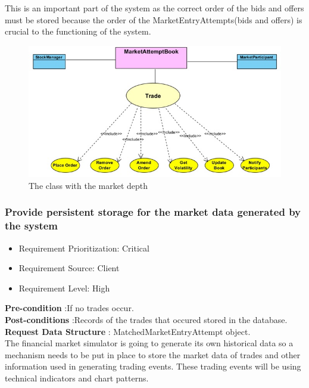\documentclass[12pt]{article}
\begin{document}
						This is an important part of the system as the correct order of the bids and offers must be stored because the order of the MarketEntryAttempts(bids and offers) is crucial to the functioning of the system.
						
						\begin{figure}[th]
									\centering
									\includegraphics[scale=0.6]{./USE_CASE_Market_Attempt_Book_Financial_Market_Simulator}
									\caption{The class with the market depth}
									\label{domain objects}
						\end{figure}
												
				\subsubsection{Provide persistent storage for the market data generated by the system}
								\begin{itemize}
									\item Requirement Prioritization: Critical
									\item Requirement Source: Client 
									\item Requirement Level: High	
								\end{itemize}
								
								\textbf{Pre-condition} :If no trades occur.\\
								\textbf{Post-conditions} :Records of the trades that occured stored in the database.\\ 
							 	\textbf{Request Data Structure} : MatchedMarketEntryAttempt object.\\
							 	
								The financial market simulator is going to generate its own historical data so a mechanism needs to be put in place to store the market data of trades and other information used in generating trading events. These trading events will be using technical indicators and chart patterns.\\
								
\end{document}
